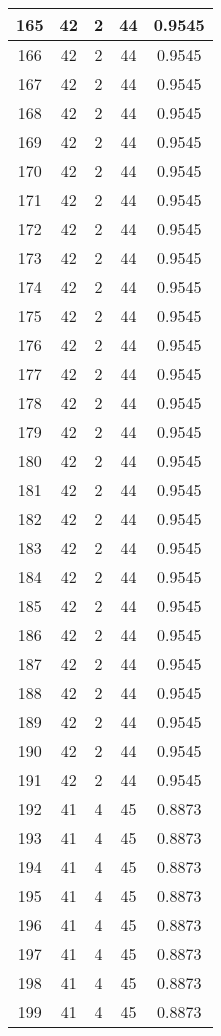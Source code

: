 \documentclass[letterpaper, 12pt]{article}
\begin{document}
\begin{longtable}{|c|c|c|c|c|}
\hline
165 & 42 & 2 & 44 & 0.9545 \\
\hline
166 & 42 & 2 & 44 & 0.9545 \\
\hline
167 & 42 & 2 & 44 & 0.9545 \\
\hline
168 & 42 & 2 & 44 & 0.9545 \\
\hline
169 & 42 & 2 & 44 & 0.9545 \\
\hline
170 & 42 & 2 & 44 & 0.9545 \\
\hline
171 & 42 & 2 & 44 & 0.9545 \\
\hline
172 & 42 & 2 & 44 & 0.9545 \\
\hline
173 & 42 & 2 & 44 & 0.9545 \\
\hline
174 & 42 & 2 & 44 & 0.9545 \\
\hline
175 & 42 & 2 & 44 & 0.9545 \\
\hline
176 & 42 & 2 & 44 & 0.9545 \\
\hline
177 & 42 & 2 & 44 & 0.9545 \\
\hline
178 & 42 & 2 & 44 & 0.9545 \\
\hline
179 & 42 & 2 & 44 & 0.9545 \\
\hline
180 & 42 & 2 & 44 & 0.9545 \\
\hline
181 & 42 & 2 & 44 & 0.9545 \\
\hline
182 & 42 & 2 & 44 & 0.9545 \\
\hline
183 & 42 & 2 & 44 & 0.9545 \\
\hline
184 & 42 & 2 & 44 & 0.9545 \\
\hline
185 & 42 & 2 & 44 & 0.9545 \\
\hline
186 & 42 & 2 & 44 & 0.9545 \\
\hline
187 & 42 & 2 & 44 & 0.9545 \\
\hline
188 & 42 & 2 & 44 & 0.9545 \\
\hline
189 & 42 & 2 & 44 & 0.9545 \\
\hline
190 & 42 & 2 & 44 & 0.9545 \\
\hline
191 & 42 & 2 & 44 & 0.9545 \\
\hline
192 & 41 & 4 & 45 & 0.8873 \\
\hline
193 & 41 & 4 & 45 & 0.8873 \\
\hline
194 & 41 & 4 & 45 & 0.8873 \\
\hline
195 & 41 & 4 & 45 & 0.8873 \\
\hline
196 & 41 & 4 & 45 & 0.8873 \\
\hline
197 & 41 & 4 & 45 & 0.8873 \\
\hline
198 & 41 & 4 & 45 & 0.8873 \\
\hline
199 & 41 & 4 & 45 & 0.8873 \\
\hline
\end{longtable}
\end{document}
